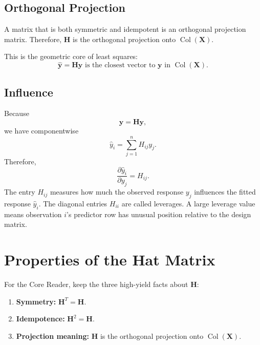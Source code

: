 {\subsection{Orthogonal Projection}

A matrix that is both symmetric and idempotent is an orthogonal projection matrix.  Therefore, \(\mathbf{H}\) is the orthogonal projection onto \(\operatorname{Col}(\mathbf{X})\).

This is the geometric core of least squares:
\begin{equation}
  \boxed{\widehat{\mathbf{y}}=\mathbf{H}\mathbf{y}\text{ is the closest vector to }\mathbf{y}\text{ in }\operatorname{Col}(\mathbf{X}).}
\end{equation}

\subsection{Influence}

Because
\begin{equation}
  \widehat{\mathbf{y}}=\mathbf{H}\mathbf{y},
\end{equation}
we have componentwise
\begin{equation}
  \widehat{y}_i=\sum_{j=1}^n H_{ij}y_j.
\end{equation}
Therefore,
\begin{equation}
  \boxed{\frac{\partial \widehat{y}_i}{\partial y_j}=H_{ij}.}
\end{equation}
The entry \(H_{ij}\) measures how much the observed response \(y_j\) influences the fitted response \(\widehat{y}_i\).  The diagonal entries \(H_{ii}\) are called leverages.  A large leverage value means observation \(i\)'s predictor row has unusual position relative to the design matrix.
}{
\section{Properties of the Hat Matrix}

For the Core Reader, keep the three high-yield facts about \(\mathbf{H}\):
\begin{enumerate}
  \item \textbf{Symmetry:} \(\mathbf{H}^T=\mathbf{H}\).
  \item \textbf{Idempotence:} \(\mathbf{H}^2=\mathbf{H}\).
  \item \textbf{Projection meaning:} \(\mathbf{H}\) is the orthogonal projection onto \(\operatorname{Col}(\mathbf{X})\).
\end{enumerate}

}
